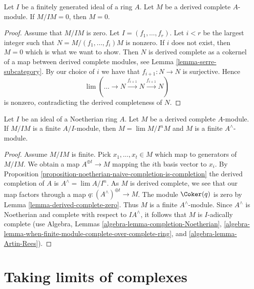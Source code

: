 \begin{lemma}
\label{lemma-derived-complete-zero}
Let $I$ be a finitely generated ideal of a ring $A$.
Let $M$ be a derived complete $A$-module.
If $M/IM = 0$, then $M = 0$.
\end{lemma}

\begin{proof}
Assume that $M/IM$ is zero. Let $I = (f_1, \ldots, f_r)$.
Let $i < r$ be the largest integer such that $N = M/(f_1, \ldots, f_i)M$
is nonzero. If $i$ does not exist, then $M = 0$ which is what we
want to show. Then $N$ is derived complete as a cokernel
of a map between derived complete modules, see
Lemma \ref{lemma-serre-subcategory}.
By our choice of $i$ we have that $f_{i + 1} : N \to N$ is surjective.
Hence
$$
\lim (\ldots \to N \xrightarrow{f_{i + 1}} N \xrightarrow{f_{i + 1}} N)
$$
is nonzero, contradicting the derived completeness of $N$.
\end{proof}

\begin{lemma}
\label{lemma-derived-complete-finite}
Let $I$ be an ideal of a Noetherian ring $A$.
Let $M$ be a derived complete $A$-module.
If $M/IM$ is a finite $A/I$-module, then
$M = \lim M/I^nM$ and $M$ is a finite $A^\wedge$-module.
\end{lemma}

\begin{proof}
Assume $M/IM$ is finite. Pick $x_1, \ldots, x_t \in M$ which map to
generators of $M/IM$. We obtain a map $A^{\oplus t} \to M$ mapping
the $i$th basis vector to $x_i$. By
Proposition \ref{proposition-noetherian-naive-completion-is-completion}
the derived completion
of $A$ is $A^\wedge = \lim A/I^n$. As $M$ is derived complete, we
see that our map factors through a map $q : (A^\wedge)^{\oplus t} \to M$.
The module $\Coker(q)$ is zero by
Lemma \ref{lemma-derived-complete-zero}.
Thus $M$ is a finite $A^\wedge$-module.
Since $A^\wedge$ is Noetherian and complete with respect to $IA^\wedge$,
it follows that $M$ is $I$-adically complete (use
Algebra, Lemmas \ref{algebra-lemma-completion-Noetherian},
\ref{algebra-lemma-when-finite-module-complete-over-complete-ring}, and
\ref{algebra-lemma-Artin-Rees}).
\end{proof}





\section{Taking limits of complexes}
\label{section-limits}

